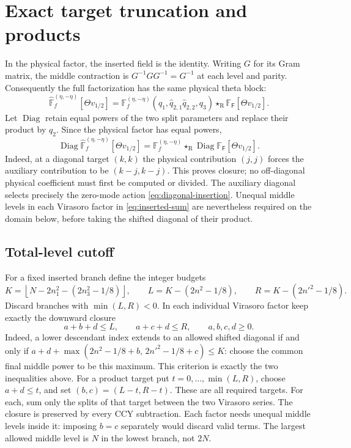 \documentclass[11pt]{article}
\newcommand{\R}{\mathrm{R}}
\newcommand{\FF}{\mathbb F}
\newcommand{\hFF}{\widehat{\mathbb F}}
\newcommand{\st}{\star_{\R}}
\numberwithin{equation}{section}
\begin{document}
\section{Exact target truncation and products}
\label{sec:truncation}

In the physical factor, the inserted field is the identity. Writing $G$ for
its Gram matrix, the middle contraction is $G^{-1}GG^{-1}=G^{-1}$ at each
level and parity.
Consequently the full factorization has the same physical theta block:
\begin{equation}
 \hFF_f^{(\eta,-\eta)}[\Theta v_{1/2}]
 =\FF_f^{(\eta,-\eta)}(q_1,\hat q_{2,1}\hat q_{2,2},q_3)
       \st\FF_{\mathsf F}[\Theta v_{1/2}].
 \label{eq:full-factorization}
\end{equation}
Let $\operatorname{Diag}$ retain equal powers of the two split parameters
and replace their product by $q_2$. Since the physical factor has equal powers,
\begin{equation}
 \operatorname{Diag}\hFF_f^{(\eta,-\eta)}[\Theta v_{1/2}]
 =\FF_f^{(\eta,-\eta)}\st
       \operatorname{Diag}\FF_{\mathsf F}[\Theta v_{1/2}].
 \label{eq:diagonal-convolution}
\end{equation}
Indeed, at a diagonal target $(k,k)$ the physical contribution $(j,j)$
forces the auxiliary contribution to be $(k-j,k-j)$. This proves closure;
no off-diagonal physical coefficient must first be computed or divided.
The auxiliary diagonal selects precisely the zero-mode action
\eqref{eq:diagonal-insertion}. Unequal middle levels in each Virasoro
factor in \eqref{eq:inserted-sum} are nevertheless required on the domain
below, before taking the shifted diagonal of their product.

\subsection{Total-level cutoff}
For a fixed inserted branch define the integer budgets
\begin{equation}
 K=\left\lfloor N-2n_1^2-(2n_3^2-1/8)\right\rfloor,\qquad
 L=K-(2n^2-1/8),\qquad R=K-(2n'^2-1/8).
\end{equation}
Discard branches with $\min(L,R)<0$. In each individual Virasoro factor
keep exactly the downward closure
\begin{equation}
 a+b+d\le L,\qquad a+c+d\le R,\qquad a,b,c,d\ge0.
 \label{eq:target-domain}
\end{equation}
Indeed, a lower descendant index extends to an allowed shifted diagonal
if and only if
$a+d+\max(2n^2-1/8+b,\,2n'^2-1/8+c)\le K$:
choose the common final middle power to be this maximum.
This criterion is exactly the two inequalities above.
For a product target put $t=0,\ldots,\min(L,R)$, choose $a+d\le t$,
and set $(b,c)=(L-t,R-t)$. These are all required targets. For each, sum
only the splits of that target between the two Virasoro series.
The closure is preserved by every CCY subtraction. Each factor needs unequal
middle levels inside it: imposing $b=c$ separately would discard valid terms.
The largest allowed middle level is $N$ in the lowest branch, not $2N$.
\end{document}
